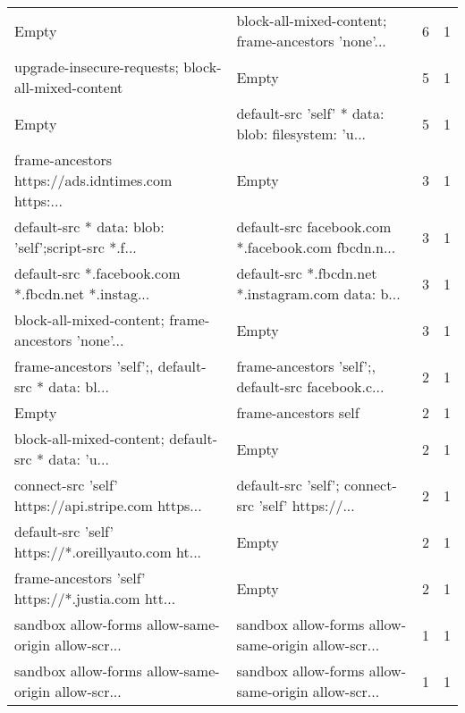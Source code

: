 \begin{tabular}{llrr}
                                             Empty & block-all-mixed-content; frame-ancestors 'none'... &     6 &      1 \\
upgrade-insecure-requests; block-all-mixed-content &                                              Empty &     5 &      1 \\
                                             Empty & default-src 'self' * data: blob: filesystem: 'u... &     5 &      1 \\
frame-ancestors https://ads.idntimes.com https:... &                                              Empty &     3 &      1 \\
default-src * data: blob: 'self';script-src *.f... & default-src facebook.com *.facebook.com fbcdn.n... &     3 &      1 \\
default-src *.facebook.com *.fbcdn.net *.instag... & default-src *.fbcdn.net *.instagram.com data: b... &     3 &      1 \\
block-all-mixed-content; frame-ancestors 'none'... &                                              Empty &     3 &      1 \\
frame-ancestors 'self';, default-src * data: bl... & frame-ancestors 'self';, default-src facebook.c... &     2 &      1 \\
                                             Empty &                               frame-ancestors self &     2 &      1 \\
block-all-mixed-content; default-src * data: 'u... &                                              Empty &     2 &      1 \\
connect-src 'self' https://api.stripe.com https... & default-src 'self'; connect-src 'self' https://... &     2 &      1 \\
default-src 'self' https://*.oreillyauto.com ht... &                                              Empty &     2 &      1 \\
frame-ancestors 'self' https://*.justia.com htt... &                                              Empty &     2 &      1 \\
sandbox allow-forms allow-same-origin allow-scr... & sandbox allow-forms allow-same-origin allow-scr... &     1 &      1 \\
sandbox allow-forms allow-same-origin allow-scr... & sandbox allow-forms allow-same-origin allow-scr... &     1 &      1 \\
\bottomrule
\end{tabular}
